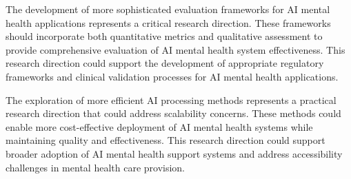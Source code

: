 The development of more sophisticated evaluation frameworks for AI mental health applications represents a critical research direction. These frameworks should incorporate both quantitative metrics and qualitative assessment to provide comprehensive evaluation of AI mental health system effectiveness. This research direction could support the development of appropriate regulatory frameworks and clinical validation processes for AI mental health applications.

The exploration of more efficient AI processing methods represents a practical research direction that could address scalability concerns. These methods could enable more cost-effective deployment of AI mental health systems while maintaining quality and effectiveness. This research direction could support broader adoption of AI mental health support systems and address accessibility challenges in mental health care provision. 